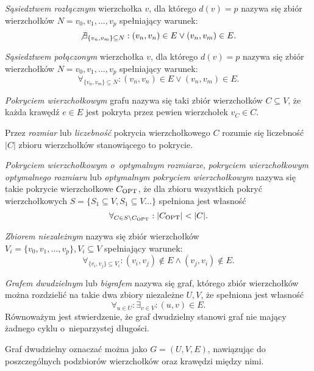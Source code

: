 \begin{definition}
  \emph{Sąsiedztwem rozłącznym} wierzchołka $v$, dla którego $d(v)=p$ nazywa się zbiór wierzchołków 
  $N={v_0, v_1, \ldots, v_p}$ spełniający warunek:\[
  \not \exists_{\{v_n, v_m\} \subseteq N}:{(v_n,v_n) \in E \lor (v_n,v_m) \in E}.
  \]
\end{definition}

\begin{definition}
  \emph{Sąsiedztwem połączonym} wierzchołka $v$, dla którego $d(v)=p$ nazywa się zbiór wierzchołków 
  $N={v_0, v_1, \ldots, v_p}$ spełniający warunek:\[
  \forall_{\{v_n, v_m\} \subseteq N}:{(v_n,v_n) \in E \lor (v_n,v_m) \in E}.
  \]
\end{definition}

\begin{definition}
  \emph{Pokryciem wierzchołkowym} grafu nazywa się taki zbiór wierzchołków
  $C \subseteq V$, że każda krawędź $e \in E$ jest pokryta przez pewien wierzchołek $ v_C \in C$.
\end{definition}

\begin{definition}
  Przez \emph{rozmiar} lub \emph{liczebność} pokrycia wierzchołkowego $C$ rozumie się liczebność $|C|$ zbioru wierzchołków stanowiącego to pokrycie.
\end{definition}

\begin{definition}
  \emph{Pokryciem wierzchołkowym o~optymalnym rozmiarze}, \emph{pokryciem wierzchołkowym optymalnego rozmiaru} lub \emph{optymalnym pokryciem wierzchołkowym} 
  nazywa się takie pokrycie wierzchołkowe $C_{\textnormal{OPT}}$, że dla zbioru wszystkich pokryć wierzchołkowych $S = \{S_1 \subseteq V, S_1 \subseteq V \ldots\}$ spełniona jest własność \[\forall_{C \in S \setminus C_{\textnormal{OPT}}}:{|C_{\textnormal{OPT}}| < |C|}.\]
\end{definition}

\begin{definition}
  \emph{Zbiorem niezależnym} nazywa się zbiór wierzchołków\\
  $V_i=\{v_0, v_1, \ldots, v_p \}, V_i \subseteq V$ spełniający warunek:
  \[\forall_{\{v_i, v_j\} \subseteq V_i}:{(v_i, v_j) \notin E \land (v_j, v_i) \notin E}.\]
\end{definition}

\begin{definition}
  \emph{Grafem dwudzielnym} lub \emph{bigrafem} nazywa się graf, którego zbiór wierzchołków można rozdzielić na takie dwa zbiory niezależne $U, V$, że spełniona jest własność \[\forall_{u \in U}: \exists_{v \in V}: (u,v) \in E.\]
  Równoważym jest stwierdzenie, że graf dwudzielny stanowi graf nie mający
  żadnego cyklu o~nieparzystej długości.

  Graf dwudzielny oznaczać można jako $G=(U,V,E)$, nawiązując do poszczególnych
  podzbiorów wierzchołków oraz krawędzi między nimi.
\end{definition}

